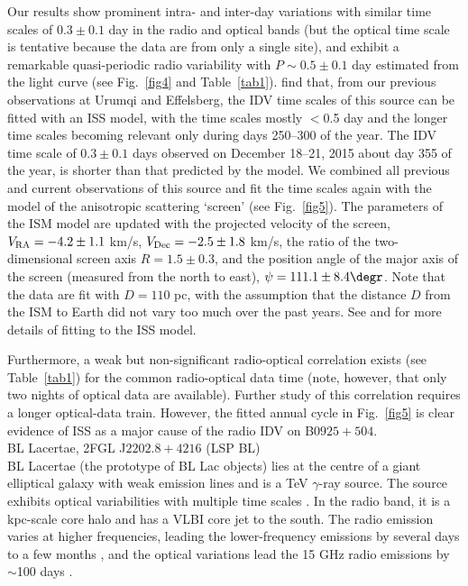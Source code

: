 \documentclass[a4paper,fleqn,usenatbib]{mnras}
\begin{document}
Our results show prominent intra- and inter-day variations with similar time scales of \(0.3\pm0.1\) day in the radio and optical bands (but the optical time scale is tentative because the data are from only a single site), and exhibit a remarkable quasi-periodic radio variability with \(P\sim0.5\pm0.1\) day estimated from the light curve (see Fig.~\ref{fig4} and Table~\ref{tab1}). \cite{liu15} find that, from our previous observations at Urumqi and Effelsberg, the IDV time scales of this source can be fitted with an ISS model, with the time scales mostly \(<\)0.5 day and the longer time scales becoming relevant only during days 250--300 of the year. The IDV time scale of \(0.3\pm0.1\) days observed on December 18--21, 2015 about day 355 of the year, is shorter than that predicted by the model. We combined all previous and current observations of this source and fit the time scales again with the model of the anisotropic scattering `screen' (see Fig.~\ref{fig5}). The parameters of the ISM model are updated with the projected velocity of the screen, \(V_{\rm RA}=-4.2\pm 1.1\) km/s, \(V_{\rm Dec}=-2.5\pm 1.8\) km/s, the ratio of the two-dimensional screen axis \(R=1.5\pm 0.3\), and the position angle of the major axis of the screen (measured from the north to east), \(\psi=111.1\pm 8.4\degr\). Note that the data are fit with \(D=110\) pc, with the assumption that the distance \(D\) from the ISM to Earth did not vary too much over the past years. See \cite{march12} and \cite{liu15} for more details of fitting to the ISS model.

Furthermore, a weak but non-significant radio-optical correlation exists (see Table~\ref{tab1}) for the common radio-optical data time (note, however, that only two nights of optical data are available). Further study of this correlation requires a longer optical-data train. However, the fitted annual cycle in Fig.~\ref{fig5} is clear evidence of ISS as a major cause of the radio IDV on B\(0925+504\).\\

BL Lacertae, 2FGL J\(2202.8+4216\) (LSP BL)\\

BL Lacertae (the prototype of BL Lac objects) lies at the centre of a giant elliptical galaxy with weak emission lines and is a TeV \(\gamma\)-ray source. The source exhibits optical variabilities with multiple time scales \citep{fan99}. In the radio band, it is a kpc-scale core halo and has a VLBI core jet to the south. The radio emission varies at higher frequencies, leading the lower-frequency emissions by several days to a few months \citep{villa04}, and the optical variations lead the 15 GHz radio emissions by \(\sim\)100 days \citep{bach06}.
\end{document}
